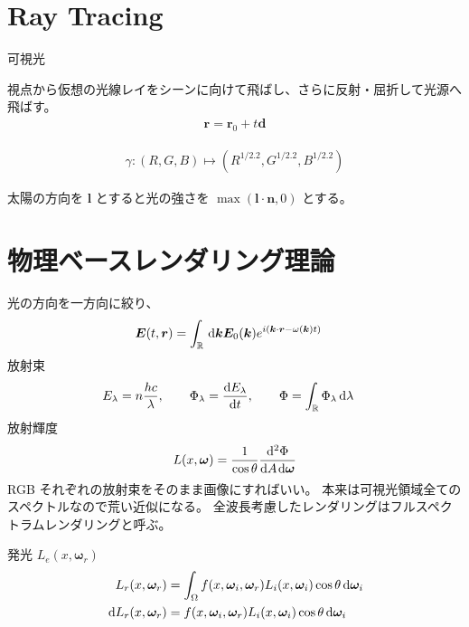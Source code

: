 \documentclass[uplatex,dvipdfmx,a4paper,11pt]{jlreq}
\newcommand{\RR}{\mathbb{R}}
\newcommand{\EE}{\bm{E}}
\newcommand{\rr}{\bm{r}}
\newcommand{\kk}{\bm{k}}
\newcommand{\omg}{\bm{\omega}}
\theoremstyle{definition}
\begin{document}
\section{Ray Tracing}
\begin{definition}
  可視光
\end{definition}
\begin{definition}
  視点から仮想の光線レイをシーンに向けて飛ばし、さらに反射・屈折して光源へ飛ばす。
  \begin{align}
    \rr = \rr_0 + t\bm{d}
  \end{align}
\end{definition}
\begin{definition}[ガンマ補正]
  \begin{align}
    \gamma: (R, G, B) \mapsto (R^{1/2.2}, G^{1/2.2}, B^{1/2.2})
  \end{align}
\end{definition}

\begin{definition}[影]
  太陽の方向を $\bm{l}$ とすると光の強さを $\max(\bm{l}\cdot\bm{n}, 0)$ とする。
\end{definition}

\section{物理ベースレンダリング理論}
\begin{definition}
  光の方向を一方向に絞り、
  \begin{align}
    \EE(t, \rr) & = \int_{\RR}\dl{\kk}\EE_0(\kk)e^{i(\kk\cdot\rr - \omega(\kk)t)}
  \end{align}
  放射束
  \begin{align}
    E_\lambda & = n\frac{hc}{\lambda}, \qquad \Phi_\lambda = \diff{E_\lambda}{t}, \qquad \Phi = \int_{\RR}\Phi_\lambda \dl{\lambda}
  \end{align}
  放射輝度
  \begin{align}
    L(x, \omg) = \frac{1}{\cos\theta}\diff{\Phi}{A, \omg}
  \end{align}
  RGB それぞれの放射束をそのまま画像にすればいい。
  本来は可視光領域全てのスペクトルなので荒い近似になる。
  全波長考慮したレンダリングはフルスペクトラムレンダリングと呼ぶ。
\end{definition}

\begin{definition}
  発光 $L_e(x, \omg_r)$
  \begin{align}
    L_r(x, \omg_r)      & = \int_\Omega f(x, \omg_i, \omg_r)L_i(x, \omg_i)\cos\theta\dl{\omg_i} \\
    \dl{L_r}(x, \omg_r) & = f(x, \omg_i, \omg_r)L_i(x, \omg_i)\cos\theta\dl{\omg_i}             \\
  \end{align}
\end{definition}
\end{document}
